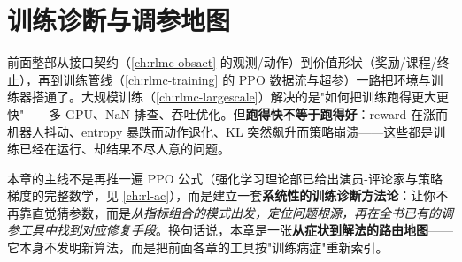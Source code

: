 \chapter{训练诊断与调参地图}\label{ch:rlmc-diag}


前面整部从接口契约（\cref{ch:rlmc-obsact} 的观测/动作）到价值形状（奖励/课程/终止），再到训练管线（\cref{ch:rlmc-training} 的 PPO 数据流与超参）一路把环境与训练器搭通了。大规模训练（\cref{ch:rlmc-largescale}）解决的是"如何把训练跑得更大更快"——多 GPU、NaN 排查、吞吐优化。但\textbf{跑得快不等于跑得好}：reward 在涨而机器人抖动、entropy 暴跌而动作退化、KL 突然飙升而策略崩溃——这些都是训练已经在运行、却结果不尽人意的问题。

本章的主线不是再推一遍 PPO 公式（强化学习理论部已给出演员-评论家与策略梯度的完整数学，见 \cref{ch:rl-ac}），而是建立一套\textbf{系统性的训练诊断方法论}：让你不再靠直觉猜参数，而是\emph{从指标组合的模式出发，定位问题根源，再在全书已有的调参工具中找到对应修复手段}。换句话说，本章是一张\textbf{从症状到解法的路由地图}——它本身不发明新算法，而是把前面各章的工具按"训练病症"重新索引。

